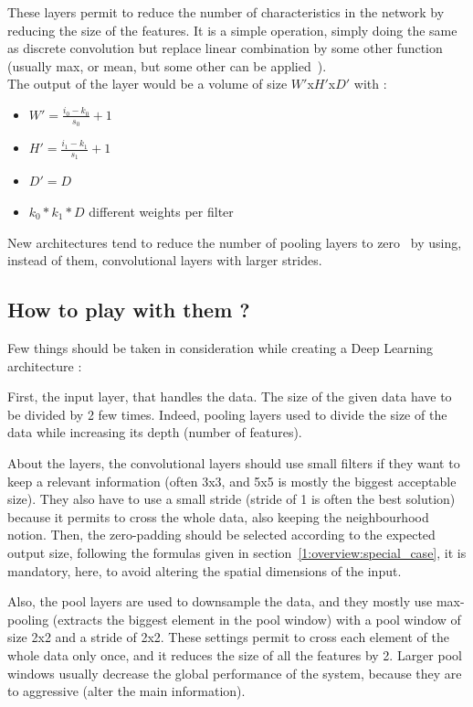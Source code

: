 \begin{itemize}
  These layers permit to reduce the number of characteristics in the network by reducing the size of the features. It is a simple operation, simply doing the same as discrete convolution but replace linear combination by some other function (usually max, or mean, but some other can be applied~\cite{BOUR10, COMA02, SAXE11}). \\
  The output of the layer would be a volume of size $W'$x$H'$x$D'$ with :
  \begin{itemize}
  \item $W' = \frac{i_0 - k_0}{s_0} + 1$
  \item $H' = \frac{i_1 - k_1}{s_1} + 1$
  \item $D' = D$
  \item $k_0 * k_1 * D$ different weights per filter
  \end{itemize}
  New architectures tend to reduce the number of pooling layers to zero~\cite{SPRI14} by using, instead of them, convolutional layers with larger strides.
\end{itemize}


\subsection{How to play with them ?} \label{1:overview:play}
Few things should be taken in consideration while creating a Deep Learning architecture :

First, the input layer, that handles the data. The size of the given data have to be divided by 2 few times. Indeed, pooling layers used to divide the size of the data while increasing its depth (number of features).

About the layers, the convolutional layers should use small filters if they want to keep a relevant information (often 3x3, and 5x5 is mostly the biggest acceptable size). They also have to use a small stride (stride of 1 is often the best solution) because it permits to cross the whole data, also keeping the neighbourhood notion. Then, the zero-padding should be selected according to the expected output size, following the formulas given in section~\ref{1:overview:special_case}, it is mandatory, here, to avoid altering the spatial dimensions of the input.

Also, the pool layers are used to downsample the data, and they mostly use max-pooling (extracts the biggest element in the pool window) with a pool window of size 2x2 and a stride of 2x2. These settings permit to cross each element of the whole data only once, and it reduces the size of all the features by 2. Larger pool windows usually decrease the global performance of the system, because they are to aggressive (alter the main information).

